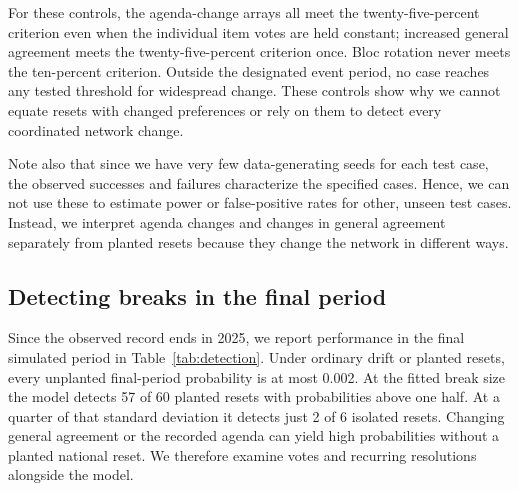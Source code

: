 \documentclass[10pt,authoryear]{elsarticle}
\begin{document}
For these controls, the agenda-change arrays all meet the twenty-five-percent criterion even when the individual item votes are held constant; increased general agreement meets the twenty-five-percent criterion once. Bloc rotation never meets the ten-percent criterion. Outside the designated event period, no case reaches any tested threshold for widespread change. These controls show why we cannot equate resets with changed preferences or rely on them to detect every coordinated network change.

Note also that since we have very few data-generating seeds for each test case, the observed successes and failures characterize the specified cases. Hence, we can not use these to estimate power or false-positive rates for other, unseen test cases. Instead, we interpret agenda changes and changes in general agreement separately from planted resets because they change the network in different ways.

\subsection{Detecting breaks in the final period}
\label{sec:terminal-detection}

Since the observed record ends in 2025, we report performance in the final simulated period in Table~\ref{tab:detection}. Under ordinary drift or planted resets, every unplanted final-period probability is at most 0.002. At the fitted break size the model detects 57 of 60 planted resets with probabilities above one half. At a quarter of that standard deviation it detects just 2 of 6 isolated resets. Changing general agreement or the recorded agenda can yield high probabilities without a planted national reset. We therefore examine votes and recurring resolutions alongside the model.
\end{document}

